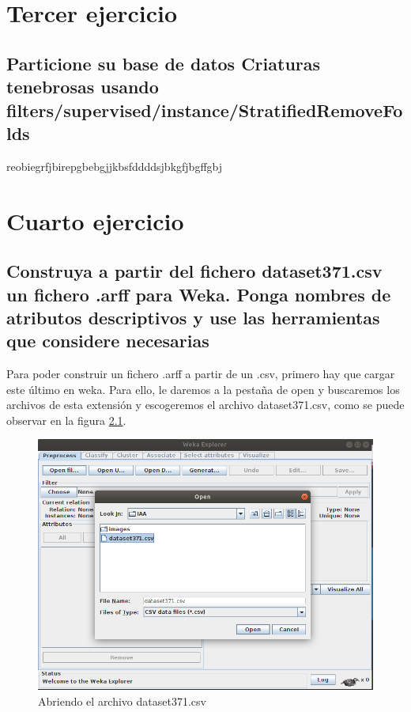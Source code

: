 \documentclass[11pt,twoside,a4paper]{book}
\begin{document}
\chapter{Tercer ejercicio}
\section{Particione su base de datos Criaturas tenebrosas \break usando filters/supervised/instance/StratifiedRemoveFolds}

reobiegrfjbirepgbebgjjkbsfddddsjbkgfjbgffgbj



\chapter{Cuarto ejercicio}
\section{Construya a partir del fichero dataset371.csv un \break fichero .arff para Weka. Ponga nombres de
\break atributos descriptivos y use las herramientas que \break considere necesarias}
Para poder construir un fichero .arff a partir de un .csv, primero hay que cargar
este último en weka. Para ello, le daremos a la pestaña de open y buscaremos los
archivos de esta extensión y escogeremos el archivo dataset371.csv, como se puede
observar en la figura \ref{Fig6}.

\begin{figure}[H]
   \begin{center}
	     \includegraphics[width=\textwidth]{ejercicio4_1.png}
   \end{center}
	\caption{Abriendo el archivo dataset371.csv}
	\label{Fig6}
\end{figure}
\end{document}
